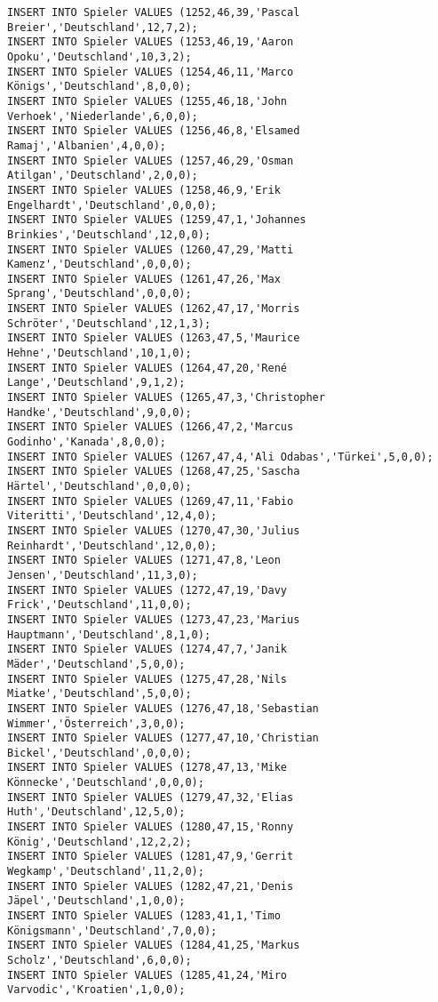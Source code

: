 \documentclass{lehramt-informatik-aufgabe}
\begin{document}
\begin{verbatim}
INSERT INTO Spieler VALUES (1252,46,39,'Pascal Breier','Deutschland',12,7,2);
INSERT INTO Spieler VALUES (1253,46,19,'Aaron Opoku','Deutschland',10,3,2);
INSERT INTO Spieler VALUES (1254,46,11,'Marco Königs','Deutschland',8,0,0);
INSERT INTO Spieler VALUES (1255,46,18,'John Verhoek','Niederlande',6,0,0);
INSERT INTO Spieler VALUES (1256,46,8,'Elsamed Ramaj','Albanien',4,0,0);
INSERT INTO Spieler VALUES (1257,46,29,'Osman Atilgan','Deutschland',2,0,0);
INSERT INTO Spieler VALUES (1258,46,9,'Erik Engelhardt','Deutschland',0,0,0);
INSERT INTO Spieler VALUES (1259,47,1,'Johannes Brinkies','Deutschland',12,0,0);
INSERT INTO Spieler VALUES (1260,47,29,'Matti Kamenz','Deutschland',0,0,0);
INSERT INTO Spieler VALUES (1261,47,26,'Max Sprang','Deutschland',0,0,0);
INSERT INTO Spieler VALUES (1262,47,17,'Morris Schröter','Deutschland',12,1,3);
INSERT INTO Spieler VALUES (1263,47,5,'Maurice Hehne','Deutschland',10,1,0);
INSERT INTO Spieler VALUES (1264,47,20,'René Lange','Deutschland',9,1,2);
INSERT INTO Spieler VALUES (1265,47,3,'Christopher Handke','Deutschland',9,0,0);
INSERT INTO Spieler VALUES (1266,47,2,'Marcus Godinho','Kanada',8,0,0);
INSERT INTO Spieler VALUES (1267,47,4,'Ali Odabas','Türkei',5,0,0);
INSERT INTO Spieler VALUES (1268,47,25,'Sascha Härtel','Deutschland',0,0,0);
INSERT INTO Spieler VALUES (1269,47,11,'Fabio Viteritti','Deutschland',12,4,0);
INSERT INTO Spieler VALUES (1270,47,30,'Julius Reinhardt','Deutschland',12,0,0);
INSERT INTO Spieler VALUES (1271,47,8,'Leon Jensen','Deutschland',11,3,0);
INSERT INTO Spieler VALUES (1272,47,19,'Davy Frick','Deutschland',11,0,0);
INSERT INTO Spieler VALUES (1273,47,23,'Marius Hauptmann','Deutschland',8,1,0);
INSERT INTO Spieler VALUES (1274,47,7,'Janik Mäder','Deutschland',5,0,0);
INSERT INTO Spieler VALUES (1275,47,28,'Nils Miatke','Deutschland',5,0,0);
INSERT INTO Spieler VALUES (1276,47,18,'Sebastian Wimmer','Österreich',3,0,0);
INSERT INTO Spieler VALUES (1277,47,10,'Christian Bickel','Deutschland',0,0,0);
INSERT INTO Spieler VALUES (1278,47,13,'Mike Könnecke','Deutschland',0,0,0);
INSERT INTO Spieler VALUES (1279,47,32,'Elias Huth','Deutschland',12,5,0);
INSERT INTO Spieler VALUES (1280,47,15,'Ronny König','Deutschland',12,2,2);
INSERT INTO Spieler VALUES (1281,47,9,'Gerrit Wegkamp','Deutschland',11,2,0);
INSERT INTO Spieler VALUES (1282,47,21,'Denis Jäpel','Deutschland',1,0,0);
INSERT INTO Spieler VALUES (1283,41,1,'Timo Königsmann','Deutschland',7,0,0);
INSERT INTO Spieler VALUES (1284,41,25,'Markus Scholz','Deutschland',6,0,0);
INSERT INTO Spieler VALUES (1285,41,24,'Miro Varvodic','Kroatien',1,0,0);

\end{verbatim}
\end{document}
